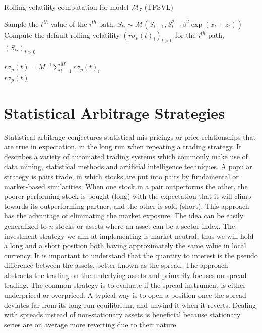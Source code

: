 \documentclass[11pt,a4,twosided,singlespacing,titlepagenumber=on]{scrreprt}
\numberwithin{equation}{chapter} %
\theoremstyle{remark}
\begin{document}
\begin{algorithm}
\caption{Rolling volatility computation for model $\mathcal{M}_7$ (TFSVL)}
\label{rolling_volatility_algo}
\begin{algorithmic}[1]

		\State Sample the $t^{th}$ value of the $i^{th}$ path, $S_{ti} \sim \mathcal{M}(S_{t-1}, S_{t-1}^2 \beta^2 \exp(x_t + z_t))$
	\State Compute the default rolling volatility $(r\sigma_p(t)_i)_{t>0}$ for the $i^{th}$ path, $(S_{ti})_{t>0}$

	\State $\displaystyle{r\sigma_p(t) = M^{-1} \sum_{i=1}^M r\sigma_p(t)_i}$
\\
\Return $r\sigma_p(t)$
\EndProcedure
\end{algorithmic}
\end{algorithm}

\chapter{Statistical Arbitrage Strategies}
Statistical arbitrage conjectures statistical mis-pricings or price relationships that are true in expectation, in the long run when repeating a trading strategy. It describes a variety of automated trading systems which commonly make use of data mining, statistical methods and artificial intelligence techniques. A popular strategy is pairs trade, in which stocks are put into pairs by fundamental or market-based similarities. When one stock in a pair outperforms the other, the poorer performing stock is bought (long) with the expectation that it will climb towards its outperforming partner, and the other is sold (short). This approach has the advantage of eliminating the market exposure. The idea can be easily generalized to $n$ stocks or assets where an asset can be a sector index. The investment strategy we aim at implementing is market neutral, thus we will hold a long and a short position both having approximately the same value in local currency. It is important to understand that the quantity to interest is the pseudo difference between the assets, better known as the spread. The approach abstracts the trading on the underlying assets and primarily focuses on spread trading. The common strategy is to evaluate if the spread instrument is either underpriced or overpriced. A typical way is to open a position once the spread deviates far from its long-run equilibrium, and unwind it when it reverts. Dealing with spreads instead of non-stationary assets is beneficial because stationary series are on average more reverting due to their nature. \\
\end{document}
